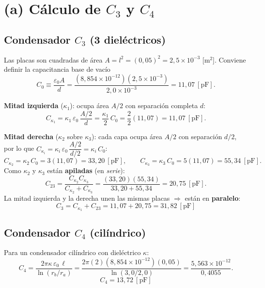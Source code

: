 \documentclass[12pt,letterpaper]{article}
\newcommand{\eps}{\varepsilon_0}
\begin{document}
\section*{(a) C\'alculo de $C_3$ y $C_4$}

\subsection*{Condensador $C_3$ (3 diel\'ectricos)}

Las placas son cuadradas de \'area $A=l^2=(0{,}05)^2=2{,}5\times10^{-3}$ [m$^2$]. Conviene definir
la capacitancia base de vac\'io
\[
    C_0 \equiv \frac{\eps A}{d}
        = \frac{(8{,}854\times10^{-12})(2{,}5\times10^{-3})}{2{,}0\times10^{-3}}
        = 11{,}07\ [\text{pF}].
\]

\noindent\textbf{Mitad izquierda} ($\kappa_1$): ocupa \'area $A/2$ con separaci\'on completa $d$:
\[
    C_{\kappa_1} = \kappa_1\,\eps\,\frac{A/2}{d} = \frac{\kappa_1}{2}\,C_0
                 = \frac{2}{2}(11{,}07) = 11{,}07\ [\text{pF}].
\]

\noindent\textbf{Mitad derecha} ($\kappa_2$ sobre $\kappa_3$): cada capa ocupa \'area $A/2$ con
separaci\'on $d/2$, por lo que $C_{\kappa_i}=\kappa_i\,\eps\,\dfrac{A/2}{d/2}=\kappa_i\,C_0$:
\[
    C_{\kappa_2} = \kappa_2\,C_0 = 3(11{,}07)=33{,}20\ [\text{pF}],
    \qquad
    C_{\kappa_3} = \kappa_3\,C_0 = 5(11{,}07)=55{,}34\ [\text{pF}].
\]
Como $\kappa_2$ y $\kappa_3$ est\'an \textbf{apiladas} (en \emph{serie}):
\[
    C_{23} = \frac{C_{\kappa_2}C_{\kappa_3}}{C_{\kappa_2}+C_{\kappa_3}}
           = \frac{(33{,}20)(55{,}34)}{33{,}20+55{,}34} = 20{,}75\ [\text{pF}].
\]
La mitad izquierda y la derecha unen las mismas placas $\Rightarrow$ est\'an en \textbf{paralelo}:
\[
    \boxed{C_3 = C_{\kappa_1} + C_{23} = 11{,}07 + 20{,}75 = 31{,}82\ [\text{pF}]}
\]

\subsection*{Condensador $C_4$ (cil\'indrico)}

Para un condensador cil\'indrico con diel\'ectrico $\kappa$:
\[
    C_4 = \frac{2\pi\kappa\,\eps\,\ell}{\ln(r_b/r_a)}
        = \frac{2\pi(2)(8{,}854\times10^{-12})(0{,}05)}{\ln(3{,}0/2{,}0)}
        = \frac{5{,}563\times10^{-12}}{0{,}4055}.
\]
\[
    \boxed{C_4 = 13{,}72\ [\text{pF}]}
\]

\end{document}
